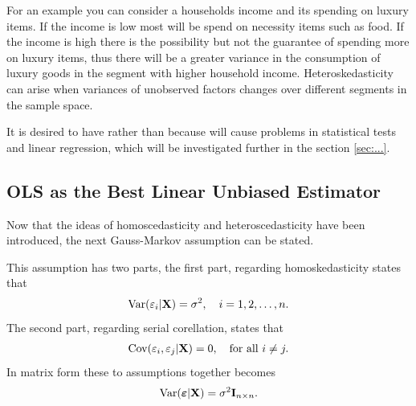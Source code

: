 For an example you can consider a households income and its spending on luxury items. If the income is low most will be spend on necessity items such as food. If the income is high there is the possibility but not the guarantee of spending more on luxury items, thus there will be a greater variance in the consumption of luxury goods in the segment with higher household income. Heteroskedasticity can arise when variances of unobserved factors changes over different segments in the sample space. 

It is desired to have \homo rather than \hetero because \hetero will cause problems in statistical tests and linear regression, which will be investigated further in the section \ref{sec:...}. 

\subsection{OLS as the Best Linear Unbiased Estimator}
Now that the ideas of homoscedasticity and heteroscedasticity have been introduced, the next Gauss-Markov assumption can be stated.
\begin{assumption}\label{as:homoskedasticity_and_no_serial_correlation}
    This assumption has two parts, the first part, regarding homoskedasticity states that
    \begin{align*}
       \operatorname{\text{Var}}(\varepsilon_i | \mathbf{X}) = \sigma^2, \quad i = 1,2, \ldots, n.
    \end{align*}
    The second part, regarding serial corellation, states that
    \begin{align*}
        \operatorname{\text{Cov}}(\varepsilon_i, \varepsilon_j | \mathbf{X}) = 0, \quad \text{for all} \ i \neq j.
    \end{align*}
    In matrix form these to assumptions together becomes
    \begin{align*}
        \operatorname{\text{Var}}(\boldsymbol{\varepsilon} | \mathbf{X}) = \sigma^2\mathbf{I}_{n\times n}.
    \end{align*}
\end{assumption}

